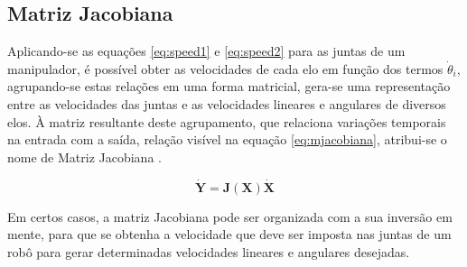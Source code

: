 \subsection{Matriz Jacobiana}
\label{sec:jacobiana}

Aplicando-se as equações \ref{eq:speed1} e \ref{eq:speed2} para as juntas
de um manipulador, é possível obter as velocidades de cada elo em função
dos termos $\dot{\theta}_i$, agrupando-se estas relações em uma forma matricial,
gera-se uma representação entre as velocidades das juntas e as velocidades
lineares e angulares de diversos elos. À matriz resultante deste 
agrupamento, que relaciona variações temporais na entrada com 
a saída, relação visível na equação \ref{eq:mjacobiana}, atribui-se o 
nome de Matriz Jacobiana \cite{craig2009introduction}.

\begin{equation}
    \label{eq:mjacobiana}
    \dot{\textbf{Y}} = \textbf{J}(\textbf{X})\dot{\textbf{X}}
\end{equation}

Em certos casos, a matriz Jacobiana pode ser organizada com a sua 
inversão em mente, para que se obtenha a velocidade que deve ser 
imposta nas juntas de um robô para gerar determinadas velocidades
lineares e angulares desejadas.